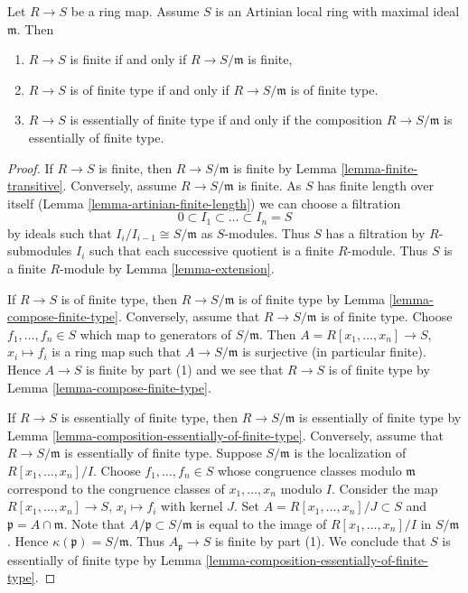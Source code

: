 \begin{lemma}
\label{lemma-essentially-of-finite-type-into-artinian-local}
Let $R \to S$ be a ring map. Assume $S$ is an Artinian local ring with
maximal ideal $\mathfrak m$. Then
\begin{enumerate}
\item $R \to S$ is finite if and only if $R \to S/\mathfrak m$ is finite,
\item $R \to S$ is of finite type if and only if $R \to S/\mathfrak m$
is of finite type.
\item $R \to S$ is essentially of finite type if and
only if the composition $R \to S/\mathfrak m$ is essentially
of finite type.
\end{enumerate}
\end{lemma}

\begin{proof}
If $R \to S$ is finite, then $R \to S/\mathfrak m$
is finite by Lemma \ref{lemma-finite-transitive}.
Conversely, assume $R \to S/\mathfrak m$ is finite.
As $S$ has finite length over itself
(Lemma \ref{lemma-artinian-finite-length})
we can choose a filtration
$$
0 \subset I_1 \subset \ldots \subset I_n = S
$$
by ideals such that $I_i/I_{i - 1} \cong S/\mathfrak m$ as $S$-modules.
Thus $S$ has a filtration by $R$-submodules $I_i$ such that each
successive quotient is a finite $R$-module. Thus $S$ is a finite
$R$-module by Lemma \ref{lemma-extension}.

\medskip\noindent
If $R \to S$ is of finite type, then $R \to S/\mathfrak m$
is of finite type by Lemma \ref{lemma-compose-finite-type}.
Conversely, assume that $R \to S/\mathfrak m$ is of finite type.
Choose $f_1, \ldots, f_n \in S$ which map to generators of $S/\mathfrak m$.
Then $A = R[x_1, \ldots, x_n] \to S$, $x_i \mapsto f_i$ is a ring map such
that $A \to S/\mathfrak m$ is surjective (in particular finite).
Hence $A \to S$ is finite by part (1) and we see that $R \to S$
is of finite type by Lemma \ref{lemma-compose-finite-type}.

\medskip\noindent
If $R \to S$ is essentially of finite type, then $R \to S/\mathfrak m$
is essentially of finite type by
Lemma \ref{lemma-composition-essentially-of-finite-type}.
Conversely, assume that $R \to S/\mathfrak m$ is essentially
of finite type. Suppose $S/\mathfrak m$ is the localization
of $R[x_1, \ldots, x_n]/I$. Choose $f_1, \ldots, f_n \in S$
whose congruence classes modulo $\mathfrak m$ correspond to
the congruence classes of $x_1, \ldots, x_n$ modulo $I$.
Consider the map $R[x_1, \ldots, x_n] \to S$, $x_i \mapsto f_i$
with kernel $J$. Set $A = R[x_1, \ldots, x_n]/J \subset S$
and $\mathfrak p = A \cap \mathfrak m$. Note that
$A/\mathfrak p \subset S/\mathfrak m$ is equal to the image
of $R[x_1, \ldots, x_n]/I$ in $S/\mathfrak m$. Hence
$\kappa(\mathfrak p) = S/\mathfrak m$. Thus $A_\mathfrak p \to S$
is finite by part (1). We conclude that $S$ is essentially of finite
type by Lemma \ref{lemma-composition-essentially-of-finite-type}.
\end{proof}